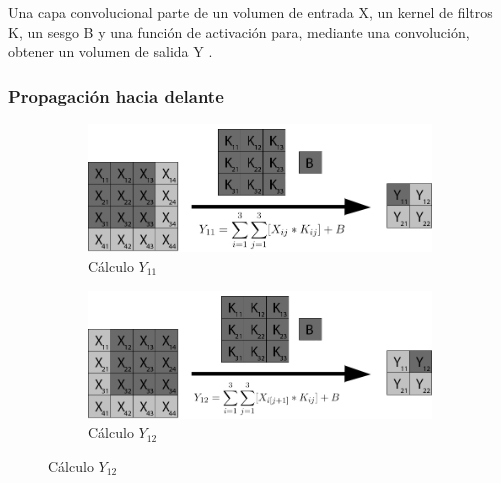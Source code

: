 Una capa convolucional parte de un volumen de entrada X, un kernel de filtros K, un sesgo B y una función de activación para, mediante una convolución, obtener un volumen de salida Y \cite{capa_convolucional} \cite{capa_convolucional_Stanford}.

\subsubsection{Propagación hacia delante}

\begin{figure}[H]
	\centering
	\begin{subfigure}{.5\textwidth}
		\hspace{-10mm}
		\includegraphics[width=1.2\linewidth]{imagenes/conv_1.jpg}  
		\caption{Cálculo $Y_{11}$}
	\end{subfigure}%
	\begin{subfigure}{.5\textwidth}
		\hspace{10mm}
		\includegraphics[width=1.2\linewidth]{imagenes/conv_2.jpg}  
		\caption{Cálculo $Y_{12}$}
	\end{subfigure}
	

\end{figure}
